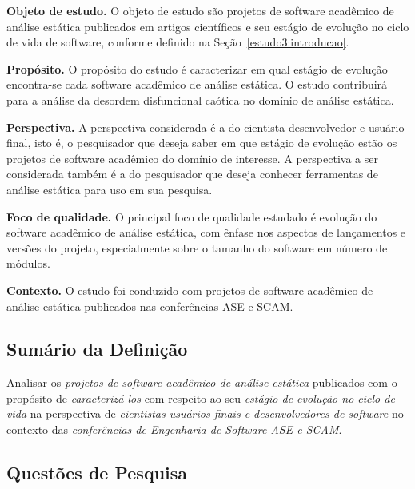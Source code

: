 \begin{description}

  \item{\bf Objeto de estudo.}
    O objeto de estudo são projetos de software acadêmico de análise estática
    publicados em artigos científicos e seu estágio de evolução no ciclo de
    vida de software, conforme definido na Seção~\ref{estudo3:introducao}.

  \item{\bf Propósito.}
    O propósito do estudo é caracterizar em qual estágio de evolução
    encontra-se cada software acadêmico de análise estática. O estudo
    contribuirá para a análise da desordem disfuncional caótica no domínio de
    análise estática. 

  \item{\bf Perspectiva.}
    A perspectiva considerada é a do cientista desenvolvedor e usuário final, isto é, o pesquisador
    que deseja saber em que estágio de evolução estão os projetos de software acadêmico do domínio
    de interesse. A perspectiva a ser considerada também é a do pesquisador que deseja
    conhecer ferramentas de análise estática para uso em sua pesquisa.

  \item{\bf Foco de qualidade.}
    O principal foco de qualidade estudado é evolução do software
    acadêmico de análise estática, com ênfase nos aspectos de lançamentos e
    versões do projeto, especialmente sobre o tamanho do software em número de
    módulos.

  \item{\bf Contexto.}
    O estudo foi conduzido com projetos de software acadêmico de análise
    estática publicados nas conferências ASE e SCAM.

\end{description}

\subsection{Sumário da Definição}

Analisar os \textit{projetos de software acadêmico de análise estática} publicados
com o propósito de \textit{caracterizá-los}
com respeito ao seu \textit{estágio de evolução no ciclo de vida}
na perspectiva de \textit{cientistas usuários finais e desenvolvedores de software}
no contexto das \textit{conferências de Engenharia de Software ASE e SCAM}.

\subsection{Questões de Pesquisa}


